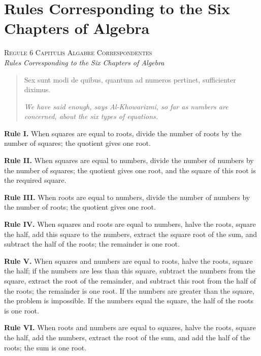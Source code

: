 \documentclass[11pt,a4paper,twoside]{book}
\begin{document}
\part*{Rules Corresponding to the Six Chapters of Algebra}

\begin{center}
\textsc{Regule 6 Capitulis Algabre Correspondentes}\\[0.3cm]
\textit{Rules Corresponding to the Six Chapters of Algebra}
\end{center}

\begin{quote}
\textlatin{Sex sunt modi de quibus, quantum ad numeros pertinet, sufficienter diximus.}

\smallskip
\textit{We have said enough, says Al-Khowarizmi, so far as numbers are concerned, about the six types of equations.}
\end{quote}

\smallskip

\textbf{Rule I.} When squares are equal to roots, divide the number of roots by the number of squares; the quotient gives one root.

\textbf{Rule II.} When squares are equal to numbers, divide the number of numbers by the number of squares; the quotient gives one root, and the square of this root is the required square.

\textbf{Rule III.} When roots are equal to numbers, divide the number of numbers by the number of roots; the quotient gives one root.

\textbf{Rule IV.} When squares and roots are equal to numbers, halve the roots, square the half, add this square to the numbers, extract the square root of the sum, and subtract the half of the roots; the remainder is one root.

\textbf{Rule V.} When squares and numbers are equal to roots, halve the roots, square the half; if the numbers are less than this square, subtract the numbers from the square, extract the root of the remainder, and subtract this root from the half of the roots; the remainder is one root. If the numbers are greater than the square, the problem is impossible. If the numbers equal the square, the half of the roots is one root.

\textbf{Rule VI.} When roots and numbers are equal to squares, halve the roots, square the half, add the numbers, extract the root of the sum, and add the half of the roots; the sum is one root.
\end{document}
